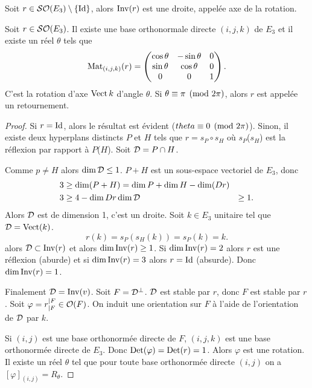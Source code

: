 \begin{defdef}
  Soit $r \in \mathcal{SO}\!\left(E_3\right)\setminus\{\operatorname{Id}\}$, alors $\operatorname{Inv}(r)$ est une droite, appelée axe de la rotation.
\end{defdef}

\begin{prop}
  Soit $r \in \mathcal{SO}\!\left(E_3\right)$. Il existe une base orthonormale directe $(i, j, k)$ de $E_3$ et il existe un réel $\theta$ tels que
  \begin{equation}
    \mathrm{Mat}_{(i, j, k)}(r) = \begin{pmatrix} \cos \theta & -\sin\theta & 0 \\ \sin\theta & \cos\theta & 0 \\ 0& 0 &1 \end{pmatrix}.
  \end{equation}
  C'est la rotation d'axe $\operatorname{Vect}{k}$ d'angle $\theta$. Si $\theta \equiv \pi \pmod {2\pi}$, alors $r$ est appelée un retournement.
\end{prop}
\begin{proof}
  Si $r=\operatorname{Id}$, alors le résultat est évident ($theta \equiv 0 \pmod {2\pi}$). Sinon, il existe deux hyperplans distincts $P$ et $H$ tels que $r=s_P \circ s_H$ où $s_P$($s_H$) est la réflexion par rapport à $P$($H$). Soit $\mathcal{D} = P \cap H$.

  Comme $p \neq H$ alors $\operatorname{dim} \mathcal{D} \leq 1$. $P+H$ est un sous-espace vectoriel de $E_3$, donc
  \begin{align}
    3 &\geq \operatorname{dim}(P+H) = \operatorname{dim} P +\operatorname{dim} H -\operatorname{dim}(Dr) \\
    3 &\geq 4 - \operatorname{dim} Dr
    \operatorname{dim} \mathcal{D} &\geq 1.
  \end{align}
  Alors $\mathcal{D}$ est de dimension 1, c'est un droite. Soit $k \in E_3$ unitaire tel que $\mathcal{D} = \operatorname{Vect}(k)$.
  \begin{equation}
    r(k) = s_P(s_H(k))=s_P(k)=k.
  \end{equation}
  alors $\mathcal{D} \subset \operatorname{Inv}(r)$ et alors $\operatorname{dim} \operatorname{Inv}(r) \geq 1$. Si $\operatorname{dim} \operatorname{Inv}(r)=2$ alors $r$ est une réflexion (aburde) et si $\operatorname{dim} \operatorname{Inv}(r)=3$ alors $r=\operatorname{Id}$ (absurde). Donc $\operatorname{dim}\operatorname{Inv}(r)=1$.

  Finalement $\mathcal{D} = \operatorname{Inv}(v)$. Soit $F=\mathcal{D}^\perp$. $\mathcal{D}$ est stable par $r$, donc $F$ est stable par $r$. Soit $\varphi=r_{|F}^{|F} \in \mathcal{O}\!\left(F\right)$. On induit une orientation sur $F$ à l'aide de l'orientation de $\mathcal{D}$ par $k$.

  Si $(i, j)$ est une base orthonormée directe de $F$, $(i, j, k)$ est une base orthonormée directe de $E_3$. Donc $\operatorname{Det}(\varphi)=\operatorname{Det}(r)=1$. Alors $\varphi$ est une rotation. Il existe un réel $\theta$ tel que pour toute base orthonormée directe $(i, j)$ on a $[\varphi]_{(i, j)}=R_\theta$.
\end{proof}

